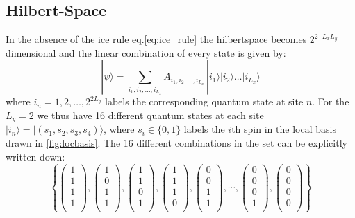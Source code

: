\documentclass[12pt, a4paper, twoside, titlepage]{article}
\begin{document}
\subsection{Hilbert-Space}
In the absence of the ice rule eq.\eqref{eq:ice_rule} the hilbertspace becomes $2^{2\cdot L_xL_y}$ dimensional  and the linear combination of every state is given by:
\begin{equation}\label{eq:hilbertspace}
|\psi\rangle = \sum_{i_1,i_2,\dots,i_{L_x}}A_{i_1,i_2,\dots,i_{L_x}} \,|i_1\rangle|i_2\rangle\dots|i_{L_x}\rangle
\end{equation}
where $i_n=1,2,\dots,2^{2L_y}$ labels the corresponding quantum state at site $n$. For the $L_y=2$
we thus have 16 different quantum states at each site $|i_n\rangle=|(s_1,s_2,s_3,s_4)\rangle$,
where $s_i\in\{0,1\}$ labels the $i$th spin in the local basis drawn in \cref{fig:locbasis}.
The 16 different combinations in the set can be explicitly written down:
\begin{equation}
  \left \{ 
  \begin{pmatrix}
  1  \\
  1 \\
  1 \\
  1 \\
  \end{pmatrix},
  \begin{pmatrix}
  1  \\
  0 \\
  1 \\
  1 \\
  \end{pmatrix},
  \begin{pmatrix}
  1  \\
  1 \\
  0 \\
  1 \\
  \end{pmatrix},
%
  \begin{pmatrix}
  1  \\
  1 \\
  1 \\
  0 \\
  \end{pmatrix},
%
  \begin{pmatrix}
  0  \\
  0 \\
  1 \\
  1 \\
  \end{pmatrix},
  \cdots,
  \begin{pmatrix}
  0  \\
  0 \\
  0 \\
  1 \\
  \end{pmatrix},
  \begin{pmatrix}
  0  \\
  0 \\
  0 \\
  0 \\
  \end{pmatrix}
  \right\}
\end{equation}
\end{document}
